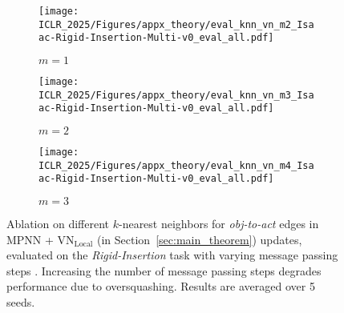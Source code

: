 \begin{figure*}[t]
    \makebox[\textwidth][c]{
    
    }
    \centering
    \hfill
    \begin{subfigure}[b]{0.32\linewidth}
        \texttt{[image: ICLR\_2025/Figures/appx\_theory/eval\_knn\_vn\_m2\_Isaac-Rigid-Insertion-Multi-v0\_eval\_all.pdf]}
        \caption{$m=1$} 
    \end{subfigure}
    \hfill
    \begin{subfigure}[b]{0.32\linewidth}
        \texttt{[image: ICLR\_2025/Figures/appx\_theory/eval\_knn\_vn\_m3\_Isaac-Rigid-Insertion-Multi-v0\_eval\_all.pdf]}
        \caption{$m=2$}
    \end{subfigure}
    \hfill
    \begin{subfigure}[b]{0.32\linewidth}
        \texttt{[image: ICLR\_2025/Figures/appx\_theory/eval\_knn\_vn\_m4\_Isaac-Rigid-Insertion-Multi-v0\_eval\_all.pdf]}
        \caption{$m=3$}
    \end{subfigure}
    \hfill
    \caption{Ablation on different $k$-nearest neighbors for \textit{obj-to-act} edges in $\text{MPNN}$ + $\text{VN}_{\text {Local}}$ (in Section~\ref{sec:main_theorem}) updates, evaluated on the \emph{Rigid-Insertion} task with varying message passing steps . Increasing the number of message passing steps degrades performance due to oversquashing. Results are averaged over 5 seeds.}

    \vspace{-0.2cm}
    \label{fig:appx_knn_vn_num_mess}
\end{figure*}

